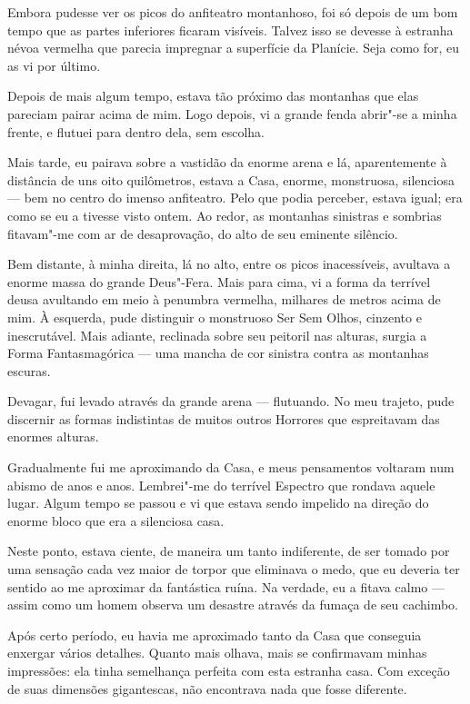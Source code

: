 Embora pudesse ver os picos do anfiteatro montanhoso, foi só depois de um bom tempo que as partes inferiores ficaram
visíveis. Talvez isso se devesse à estranha névoa vermelha que parecia impregnar a superfície da Planície. Seja como
for, eu as vi por último.

Depois de mais algum tempo, estava tão próximo das montanhas que elas pareciam pairar acima de mim. Logo
depois, vi a grande fenda abrir"-se a minha frente, e flutuei para dentro dela, sem escolha.

Mais tarde, eu pairava sobre a vastidão da enorme arena e lá, aparentemente à distância de uns oito quilômetros,
estava a Casa, enorme, monstruosa, silenciosa --- bem no centro do imenso anfiteatro. Pelo que podia perceber, estava
igual; era como se eu a tivesse visto ontem. Ao redor, as montanhas sinistras e sombrias fitavam"-me com ar
de desaprovação, do alto de seu eminente silêncio.

Bem distante, à minha direita, lá no alto, entre os picos inacessíveis, avultava a enorme massa do grande Deus"-Fera.
Mais para cima, vi a forma da terrível deusa avultando em meio à penumbra vermelha, milhares de metros acima de mim.
À esquerda, pude distinguir o monstruoso Ser Sem Olhos, cinzento e inescrutável. Mais adiante, reclinada sobre seu
peitoril nas alturas, surgia a Forma Fantasmagórica --- uma mancha de cor sinistra contra as montanhas escuras.

Devagar, fui levado através da grande arena --- flutuando. No meu trajeto, pude discernir as formas indistintas de
muitos outros Horrores que espreitavam das enormes alturas.

Gradualmente fui me aproximando da Casa, e meus pensamentos voltaram num abismo de anos e anos. Lembrei"-me do terrível
Espectro que rondava aquele lugar. Algum tempo se passou e vi que estava sendo impelido na direção do enorme bloco que
era a silenciosa casa.

Neste ponto, estava ciente, de maneira um tanto indiferente, de ser tomado por uma sensação cada vez maior de torpor
que eliminava o medo, que eu deveria ter sentido ao me aproximar da fantástica ruína. Na verdade, eu a fitava
calmo --- assim como um homem observa um desastre através da fumaça de seu cachimbo.

Após certo período, eu havia me aproximado tanto da Casa que conseguia enxergar vários detalhes. Quanto mais olhava,
mais se confirmavam minhas impressões: ela tinha semelhança perfeita com esta estranha casa. Com exceção de suas
dimensões gigantescas, não encontrava nada que fosse diferente.

